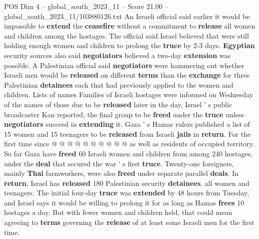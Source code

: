 \begin{textsample}{POS Dim 4 – global\_south\_2023\_11 – Score 21.00 – global\_south\_2023\_11/103880126.txt}
An Israeli official said earlier it would be impossible to \textbf{extend} the \textbf{ceasefire} without a commitment to \textbf{release} all women and children among the hostages.
The official said Israel believed that were still holding enough women and children to prolong the \textbf{truce} by 2-3 days. \textbf{Egyptian} security sources also said \textbf{negotiators} believed a two-day \textbf{extension} was possible.
A Palestinian official said \textbf{negotiators} were hammering out whether Israeli men would be \textbf{released} on different \textbf{terms} than the \textbf{exchange} for three Palestinian \textbf{detainees} each that had previously applied to the women and children.
Lists of names Families of Israeli hostages were informed on Wednesday of the names of those due to be \textbf{released} later in the day, Israel ' s public broadcaster Kan reported, the final group to be \textbf{freed} under the \textbf{truce} unless \textbf{negotiators} succeed in \textbf{extending} it.
Gaza ' s Hamas rulers published a list of 15 women and 15 teenagers to be \textbf{released} from Israeli \textbf{jails} in \textbf{return}.
For the first time since @ @ @ @ @ @ @ @ @ @ as well as residents of occupied territory.
So far Gaza have \textbf{freed} 60 Israeli women and children from among 240 hostages, under the \textbf{deal} that secured the war ' s first \textbf{truce}.
Twenty-one foreigners, mainly \textbf{Thai} farmworkers, were also \textbf{freed} under separate parallel \textbf{deals}.
In \textbf{return}, Israel has \textbf{released} 180 Palestinian security \textbf{detainees}, all women and teenagers.
The initial four-day \textbf{truce} was \textbf{extended} by 48 hours from Tuesday, and Israel says it would be willing to prolong it for as long as Hamas \textbf{frees} 10 hostages a day.
But with fewer women and children held, that could mean agreeing to \textbf{terms} governing the \textbf{release} of at least some Israeli men for the first time.

\end{textsample}
